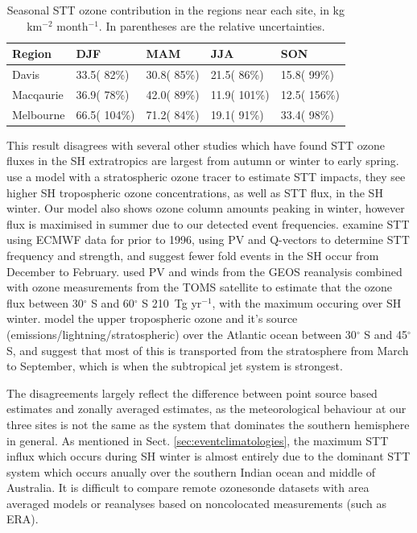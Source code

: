 \documentclass[acp, manuscript]{copernicus} %
\begin{document}
    \begin{table}[t]
      \captionsetup{justification=centering}
      \caption{Seasonal STT ozone contribution in the regions near each site, in kg km$^{-2}$ month$^{-1}$. In parentheses are the relative uncertainties.}
      \begin{tabular}{ l l l l l } 
	\hline
	Region & DJF & MAM & JJA & SON \\
	\hline
	Davis       & 33.5(   82\%) & 30.8(   85\%) & 21.5(   86\%) & 15.8(   99\%)  \\ 
	Macqaurie   & 36.9(   78\%) & 42.0(   89\%) & 11.9(  101\%) & 12.5(  156\%)  \\
	Melbourne   & 66.5(  104\%) & 71.2(   84\%) & 19.1(   91\%) & 33.4(   98\%)  \\
	\hline
      \end{tabular}
      \label{table:extrapolationResults}
    \end{table}
    
    This result disagrees with several other studies which have found STT ozone fluxes in the SH extratropics are largest from autumn or winter to early spring.
    \cite{Roelofs1997} use a model with a stratospheric ozone tracer to estimate STT impacts, they see higher SH tropospheric ozone concentrations, as well as STT flux, in the SH winter.
    Our model also shows ozone column amounts peaking in winter, however flux is maximised in summer due to our detected event frequencies.
    \cite{Elbern1998} examine STT using ECMWF data for prior to 1996, using PV and Q-vectors to determine STT frequency and strength, and suggest fewer fold events in the SH occur from December to February.
    \citet{Olsen2003} used PV and winds from the GEOS reanalysis combined with ozone measurements from the TOMS satellite to estimate that the ozone flux between 30$^{\circ}$ S and 60$^{\circ}$ S 210~Tg yr$^{-1}$, with the maximum occuring over SH winter.
    \citet{Liu2016} model the upper tropospheric ozone and it's source (emissions/lightning/stratospheric) over the Atlantic ocean between 30$^{\circ}$ S and 45$^{\circ}$ S, and suggest that most of this is transported from the stratosphere from March to September, which is when the subtropical jet system is strongest.
    
    The disagreements largely reflect the difference between point source based estimates and zonally averaged estimates, as the meteorological behaviour at our three sites is not the same as the system that dominates the southern hemisphere in general.
    As mentioned in Sect. \ref{sec:eventclimatologies}, the maximum STT influx which occurs during SH winter is almost entirely due to the dominant STT system which occurs anually over the southern Indian ocean and middle of Australia.
    It is difficult to compare remote ozonesonde datasets with area averaged models or reanalyses based on noncolocated measurements (such as ERA).
    
\end{document}
